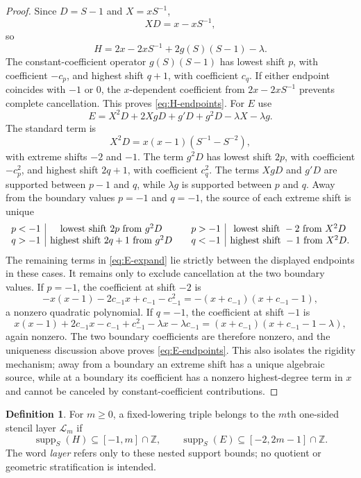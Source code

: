 \documentclass[11pt,reqno]{amsart}
\numberwithin{equation}{section}
\theoremstyle{definition}
\newtheorem{definition}[theorem]{Definition}
\theoremstyle{remark}
\newcommand{\Z}{\mathbb Z}
\newcommand{\calL}{\mathcal L}
\newcommand{\supp}{\operatorname{supp}}
\begin{document}
\begin{proof}
Since $D=S-1$ and $X=xS^{-1}$,
\[
 XD=x-xS^{-1},
\]
so
\begin{equation}\label{eq:H-shift-form}
 H=2x-2xS^{-1}+2g(S)(S-1)-\lambda.
\end{equation}
The constant-coefficient operator $g(S)(S-1)$ has lowest shift $p$, with coefficient $-c_p$, and highest shift $q+1$, with coefficient $c_q$.  If either endpoint coincides with $-1$ or $0$, the $x$-dependent coefficient from $2x-2xS^{-1}$ prevents complete cancellation.  This proves \eqref{eq:H-endpoints}. For $E$ use
\begin{equation}\label{eq:E-expand}
 E=X^2D+2XgD+g'D+g^2D-\lambda X-\lambda g.
\end{equation}
The standard term is
\[
 X^2D=x(x-1)(S^{-1}-S^{-2}),
\]
with extreme shifts $-2$ and $-1$.  The term $g^2D$ has lowest shift $2p$, with coefficient $-c_p^2$, and highest shift $2q+1$, with coefficient $c_q^2$.  The terms $XgD$ and $g'D$ are supported between $p-1$ and $q$, while $\lambda g$ is supported between $p$ and $q$. Away from the boundary values $p=-1$ and $q=-1$, the source of each extreme shift is unique
\[
\begin{array}{c|c@{\qquad}c|c}
 p<-1 & \text{lowest shift }2p\text{ from }g^2D
 & p>-1 & \text{lowest shift }-2\text{ from }X^2D\\
 q>-1 & \text{highest shift }2q+1\text{ from }g^2D
 & q<-1 & \text{highest shift }-1\text{ from }X^2D.
\end{array}
\]
The remaining terms in \eqref{eq:E-expand} lie strictly between the displayed endpoints in these cases.  It remains only to exclude cancellation at the two boundary values.  If $p=-1$, the coefficient at shift $-2$ is
\[
 -x(x-1)-2c_{-1}x+c_{-1}-c_{-1}^2
 =-(x+c_{-1})(x+c_{-1}-1),
\]
a nonzero quadratic polynomial.  If $q=-1$, the coefficient at shift $-1$ is
\[
 x(x-1)+2c_{-1}x-c_{-1}+c_{-1}^2-\lambda x-\lambda c_{-1}
 =(x+c_{-1})(x+c_{-1}-1-\lambda),
\]
again nonzero.  The two boundary coefficients are therefore nonzero, and the uniqueness discussion above proves \eqref{eq:E-endpoints}.  This also isolates the rigidity mechanism; away from a boundary an extreme shift has a unique algebraic source, while at a boundary its coefficient has a nonzero highest-degree term in $x$ and cannot be canceled by constant-coefficient contributions.
\end{proof}

\begin{definition}\label{def:layers}
For $m\ge0$, a fixed-lowering triple belongs to the $m$th one-sided stencil layer $\calL_m$ if
\begin{equation}\label{eq:layer}
 \supp_S(H)\subseteq[-1,m]\cap\Z,
 \qquad
 \supp_S(E)\subseteq[-2,2m-1]\cap\Z.
\end{equation}
The word \emph{layer} refers only to these nested support bounds; no quotient or geometric stratification is intended.
\end{definition}
\end{document}
